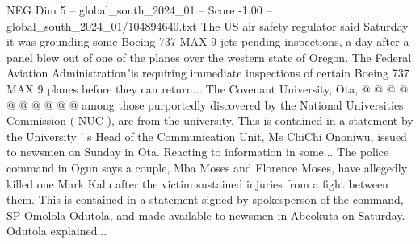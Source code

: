 \begin{textsample}{NEG Dim 5 – global\_south\_2024\_01 – Score -1.00 – global\_south\_2024\_01/104894640.txt}
The US air safety regulator said Saturday it was grounding some Boeing 737 MAX 9 jets pending inspections, a day after a panel blew out of one of the planes over the western state of Oregon.
The Federal Aviation Administration"is requiring immediate inspections of certain Boeing 737 MAX 9 planes before they can return...
The Covenant University, Ota, @ @ @ @ @ @ @ @ @ @ among those purportedly discovered by the National Universities Commission ( NUC ), are from the university.
This is contained in a statement by the University ' s Head of the Communication Unit, Ms ChiChi Ononiwu, issued to newsmen on Sunday in Ota.
Reacting to information in some...
The police command in Ogun says a couple, Mba Moses and Florence Moses, have allegedly killed one Mark Kalu after the victim sustained injuries from a fight between them.
This is contained in a statement signed by spokesperson of the command, SP Omolola Odutola, and made available to newsmen in Abeokuta on Saturday.
Odutola explained...

\end{textsample}
